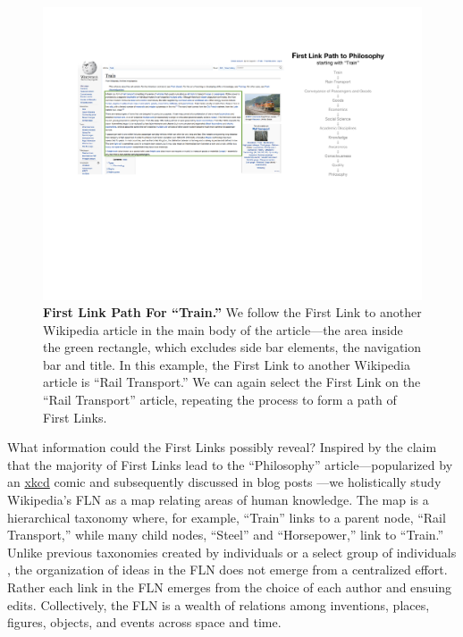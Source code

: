 \documentclass[pre,twocolumn,twoside,superscriptaddress,floatfix, aps, 10pt]{revtex4-1}
\begin{document}
\begin{figure}[tp!]
  \includegraphics[width=\textwidth]{graphics/Train.pdf}  
  \caption{
    \textbf{First Link Path For ``Train.''}
    We follow the First Link to another Wikipedia article
    in the main body of the article---the area
    inside the green rectangle, which excludes 
    side bar elements, the navigation bar and title. 
    In this example, the First Link to another Wikipedia article is ``Rail Transport.'' 
    We can again select the First Link on the ``Rail Transport''
    article, repeating the process to 
    form a path of First Links.
  }
  \label{fig:Train First Links}
\end{figure}

What information could the First Links possibly reveal?
Inspired by the claim that the majority of First Links lead to the 
``Philosophy'' article---popularized by an 
\href{https://xkcd.com/903/}{xkcd}
comic and subsequently
discussed in blog posts 
\cite{mat_blog, Ilmari_first_links, xkcd}
---we holistically study 
Wikipedia's FLN as a map relating areas of human knowledge. 
The map is a hierarchical taxonomy where, for example, ``Train'' links to a parent node, 
``Rail Transport,'' while many child nodes, ``Steel'' and ``Horsepower,'' link to 
``Train.'' Unlike previous taxonomies
created by individuals
\cite{locke, descartes, aristotle}
or a select group of individuals 
\cite{hist_thesaurus}, 
the organization of ideas in the FLN 
does not emerge from a centralized effort. 
Rather each link in the FLN emerges from the choice of each author and ensuing edits.
Collectively, the FLN is a wealth of relations among inventions, places,
figures, objects, and events across space and time.
\end{document}
